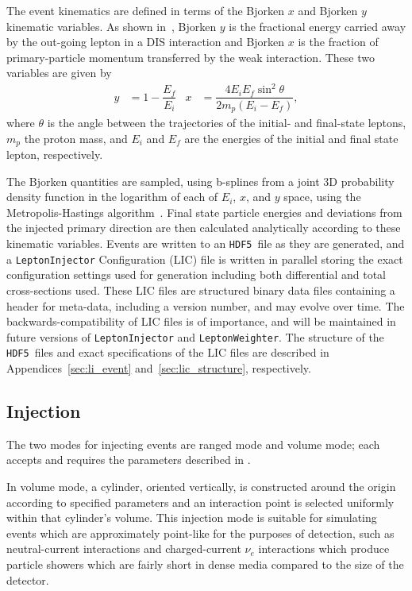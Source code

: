 \documentclass[main.tex]{subfiles}
\newcommand{\LeptonInjector}{\texttt{LeptonInjector}}
\newcommand{\LeptonWeighter}{\texttt{LeptonWeighter}}
\newcommand{\hdf}{\texttt{HDF5}}
\begin{document}
The event kinematics are defined in terms of the Bjorken $x$ and Bjorken $y$ kinematic variables.
As shown in~, Bjorken $y$ is the fractional energy carried away by the out-going lepton in a DIS interaction and Bjorken $x$ is the fraction of primary-particle momentum transferred by the weak interaction.
These two variables are given by
\begin{align}\label{eq:bjorken}
y&=1-\dfrac{E_{f}}{E_{i}} & x&=\dfrac{4 E_{i} E_{f}\sin^{2}\theta}{2m_{p}(E_{i}-E_{f})},
\end{align}
where $\theta$ is the angle between the trajectories of the initial- and final-state leptons, $m_{p}$ the proton mass, and $E_{i}$ and $E_{f}$ are the energies of the initial and final state lepton, respectively.

The Bjorken quantities are sampled, using b-splines from a joint 3D probability density function in the logarithm of each of $E_{i}$, $x$, and $y$ space, using the Metropolis-Hastings algorithm~\cite{MetHast:10.1093}.
Final state particle energies and deviations from the injected primary direction are then calculated analytically according to these kinematic variables.
Events are written to an \hdf~file as they are generated, and a \LeptonInjector{} Configuration (LIC) file is written in parallel storing the exact configuration settings used for generation including both differential and total cross-sections used.
These LIC files are structured binary data files containing a header for meta-data, including a version number, and may evolve over time.
The backwards-compatibility of LIC files is of importance, and will be maintained in future versions of \LeptonInjector{} and \LeptonWeighter{}.
The structure of the \hdf~files and exact specifications of the LIC files are described in Appendices~\ref{sec:li_event} and~\ref{sec:lic_structure}, respectively. 

\subsection{Injection}\label{sec:injection}

The two modes for injecting events are ranged mode and volume mode; each accepts and requires the parameters described in .

In volume mode, a cylinder, oriented vertically, is constructed around the origin according to specified parameters and an interaction point is selected uniformly within that cylinder's volume.
This injection mode is suitable for simulating events which are approximately point-like for the purposes of detection, such as neutral-current interactions and charged-current $\nu_e$ interactions which produce particle showers which are fairly short in dense media compared to the size of the detector.
\end{document}
